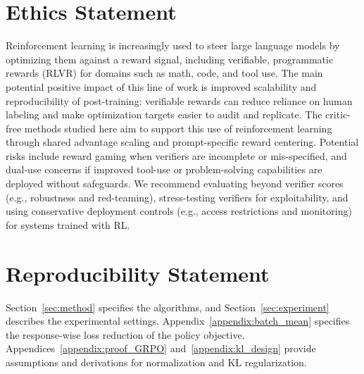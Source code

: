 \documentclass{article}
\theoremstyle{plain}
\theoremstyle{definition}
\theoremstyle{remark}
\begin{document}
\section*{Ethics Statement}

Reinforcement learning is increasingly used to steer large language models by optimizing them against a reward signal, including verifiable, programmatic rewards (RLVR) for domains such as math, code, and tool use. The main potential positive impact of this line of work is improved scalability and reproducibility of post-training: verifiable rewards can reduce reliance on human labeling and make optimization targets easier to audit and replicate. The critic-free methods studied here aim to support this use of reinforcement learning through shared advantage scaling and prompt-specific reward centering. Potential risks include reward gaming when verifiers are incomplete or mis-specified, and dual-use concerns if improved tool-use or problem-solving capabilities are deployed without safeguards. We recommend evaluating beyond verifier scores (e.g., robustness and red-teaming), stress-testing verifiers for exploitability, and using conservative deployment controls (e.g., access restrictions and monitoring) for systems trained with RL.

\section*{Reproducibility Statement}
Section~\ref{sec:method} specifies the algorithms, and Section~\ref{sec:experiment} describes the experimental settings. Appendix~\ref{appendix:batch_mean} specifies the response-wise loss reduction of the policy objective. Appendices~\ref{appendix:proof_GRPO} and~\ref{appendix:kl_design} provide assumptions and derivations for normalization and KL regularization.




\appendix



\end{document}
